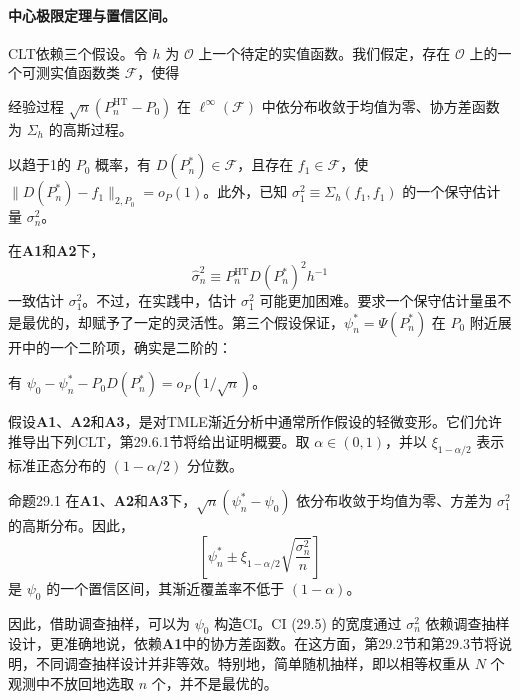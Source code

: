 \paragraph{中心极限定理与置信区间。}
CLT依赖三个假设。令 $h$ 为 $\mathcal O$ 上一个待定的实值函数。我们假定，存在 $\mathcal O$ 上的一个可测实值函数类 $\mathcal F$，使得
\begin{description}[leftmargin=2.7em,labelsep=0.6em]
\item[\textbf{A1.}] 经验过程 $\sqrt n(P_n^{\mathrm{HT}}-P_0)$ 在 $\ell^\infty(\mathcal F)$ 中依分布收敛于均值为零、协方差函数为 $\Sigma_h$ 的高斯过程。
\item[\textbf{A2.}] 以趋于1的 $P_0$ 概率，有 $D(P_n^*)\in\mathcal F$，且存在 $f_1\in\mathcal F$，使 $\|D(P_n^*)-f_1\|_{2,P_0}=o_P(1)$。此外，已知 $\sigma_1^2\equiv\Sigma_h(f_1,f_1)$ 的一个保守估计量 $\sigma_n^2$。
\end{description}
在\textbf{A1}和\textbf{A2}下，
\begin{equation}
\hat\sigma_n^2\equiv P_n^{\mathrm{HT}}D(P_n^*)^2h^{-1}
\tag{29.4}
\end{equation}
一致估计 $\sigma_1^2$。不过，在实践中，估计 $\sigma_1^2$ 可能更加困难。要求一个保守估计量虽不是最优的，却赋予了一定的灵活性。第三个假设保证，$\psi_n^*=\Psi(P_n^*)$ 在 $P_0$ 附近展开中的一个二阶项，确实是二阶的：
\begin{description}[leftmargin=2.7em,labelsep=0.6em]
\item[\textbf{A3.}] 有 $\psi_0-\psi_n^*-P_0D(P_n^*)=o_P(1/\sqrt n)$。
\end{description}
假设\textbf{A1}、\textbf{A2}和\textbf{A3}，是对TMLE渐近分析中通常所作假设的轻微变形。它们允许推导出下列CLT，第29.6.1节将给出证明概要。取 $\alpha\in(0,1)$，并以 $\xi_{1-\alpha/2}$ 表示标准正态分布的 $(1-\alpha/2)$ 分位数。

\begin{bookresult}{命题}{29.1}
在\textbf{A1}、\textbf{A2}和\textbf{A3}下，$\sqrt n(\psi_n^*-\psi_0)$ 依分布收敛于均值为零、方差为 $\sigma_1^2$ 的高斯分布。因此，
\begin{equation}
\left[\psi_n^*\pm\xi_{1-\alpha/2}\sqrt{\frac{\sigma_n^2}{n}}\right]
\tag{29.5}
\end{equation}
是 $\psi_0$ 的一个置信区间，其渐近覆盖率不低于 $(1-\alpha)$。
\end{bookresult}

因此，借助调查抽样，可以为 $\psi_0$ 构造CI。CI (29.5) 的宽度通过 $\sigma_n^2$ 依赖调查抽样设计，更准确地说，依赖\textbf{A1}中的协方差函数。在这方面，第29.2节和第29.3节将说明，不同调查抽样设计并非等效。特别地，简单随机抽样，即以相等权重从 $N$ 个观测中不放回地选取 $n$ 个，并不是最优的。
